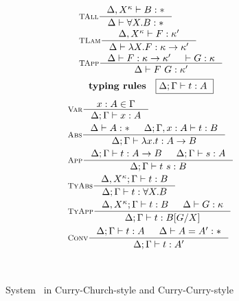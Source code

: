 \begin{figure}
\begin{singlespace}
\begin{minipage}{.46\textwidth}
\begin{align*}
& \inference[\sc TAll]{\Delta,X^\kappa |- B:*}{\Delta |- \forall X.B:*} \\
& \inference[\sc TLam]{\Delta,X^\kappa |- F:\kappa'}
		      {\Delta |- \l X.F:\kappa -> \kappa'} \\
& \inference[\sc TApp]{\Delta |- F : \kappa -> \kappa' & |- G : \kappa}
		      {\Delta |- F ~ G : \kappa'} \\
\end{align*}
\[ \textbf{typing rules} \quad \framebox{$ \Delta;\Gamma |- t : A $ } \]
\vspace*{-1em}
\begin{align*}
& \inference[\sc Var]{x:A \in \Gamma}{\Delta;\Gamma |- x:A} \\
& \inference[\sc Abs]{\Delta |- A:* & \Delta;\Gamma,x:A |- t : B}
		     {\Delta;\Gamma |- \l x   .t : A -> B} \\
& \inference[\sc App]{\Delta;\Gamma |- t : A -> B & \Delta;\Gamma |- s : A}
		     {\Delta;\Gamma |- t~s : B} \\
& \inference[\sc TyAbs]{\Delta,X^\kappa;\Gamma |- t : B}
		       {\Delta;\Gamma |- t : \forall X.B} \\
& \inference[\sc TyApp]{\Delta,X^\kappa;\Gamma |- t : B & \Delta |- G:\kappa}
		       {\Delta;\Gamma |- t : B[G/X]} \\
& \inference[\sc Conv]{\Delta;\Gamma |- t : A & \Delta |- A = A' : *}
		      {\Delta;\Gamma |- t : A'}
\end{align*}
\end{minipage}
~\\
\caption{System \Fw\ in Curry-Church-style and Curry-Curry-style}
\label{fig:fw2}
\end{singlespace}
\end{figure}

